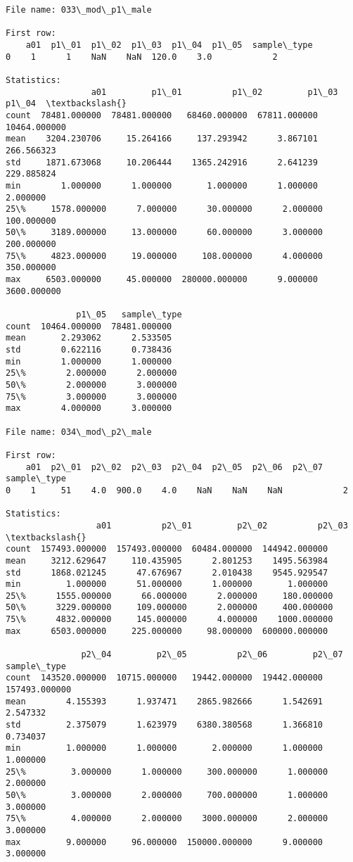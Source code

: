\documentclass[11pt]{article}
\begin{document}
\begin{Verbatim}[commandchars=\\\{\}]
File name: 033\_mod\_p1\_male

First row: 
    a01  p1\_01  p1\_02  p1\_03  p1\_04  p1\_05  sample\_type
0    1      1    NaN    NaN  120.0    3.0            2

Statistics: 
                 a01         p1\_01          p1\_02         p1\_03         p1\_04  \textbackslash{}
count  78481.000000  78481.000000   68460.000000  67811.000000  10464.000000   
mean    3204.230706     15.264166     137.293942      3.867101    266.566323   
std     1871.673068     10.206444    1365.242916      2.641239    229.885824   
min        1.000000      1.000000       1.000000      1.000000      2.000000   
25\%     1578.000000      7.000000      30.000000      2.000000    100.000000   
50\%     3189.000000     13.000000      60.000000      3.000000    200.000000   
75\%     4823.000000     19.000000     108.000000      4.000000    350.000000   
max     6503.000000     45.000000  280000.000000      9.000000   3600.000000   

              p1\_05   sample\_type  
count  10464.000000  78481.000000  
mean       2.293062      2.533505  
std        0.622116      0.738436  
min        1.000000      1.000000  
25\%        2.000000      2.000000  
50\%        2.000000      3.000000  
75\%        3.000000      3.000000  
max        4.000000      3.000000  

File name: 034\_mod\_p2\_male

First row: 
    a01  p2\_01  p2\_02  p2\_03  p2\_04  p2\_05  p2\_06  p2\_07  sample\_type
0    1     51    4.0  900.0    4.0    NaN    NaN    NaN            2

Statistics: 
                  a01          p2\_01         p2\_02          p2\_03  \textbackslash{}
count  157493.000000  157493.000000  60484.000000  144942.000000   
mean     3212.629647     110.435905      2.801253    1495.563984   
std      1868.021245      47.676967      2.010438    9545.929547   
min         1.000000      51.000000      1.000000       1.000000   
25\%      1555.000000      66.000000      2.000000     180.000000   
50\%      3229.000000     109.000000      2.000000     400.000000   
75\%      4832.000000     145.000000      4.000000    1000.000000   
max      6503.000000     225.000000     98.000000  600000.000000   

               p2\_04         p2\_05          p2\_06         p2\_07    sample\_type  
count  143520.000000  10715.000000   19442.000000  19442.000000  157493.000000  
mean        4.155393      1.937471    2865.982666      1.542691       2.547332  
std         2.375079      1.623979    6380.380568      1.366810       0.734037  
min         1.000000      1.000000       2.000000      1.000000       1.000000  
25\%         3.000000      1.000000     300.000000      1.000000       2.000000  
50\%         3.000000      2.000000     700.000000      1.000000       3.000000  
75\%         4.000000      2.000000    3000.000000      2.000000       3.000000  
max         9.000000     96.000000  150000.000000      9.000000       3.000000  


\end{Verbatim}
\end{document}
